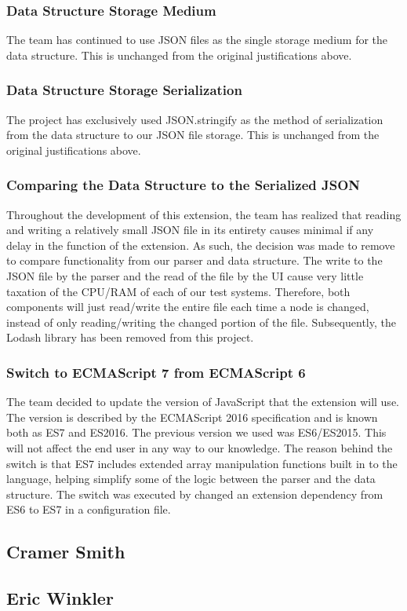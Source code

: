 \documentclass[letterpaper,10pt,titlepage,draftclsnofoot,onecolumn,onesided] {IEEEtran}
\begin{document}
\subsubsection{Data Structure Storage Medium}
The team has continued to use JSON files as the single storage medium for the data structure. 
This is unchanged from the original justifications above.

\subsubsection{Data Structure Storage Serialization}
The project has exclusively used JSON.stringify as the method of serialization from the data structure to our JSON file storage. 
This is unchanged from the original justifications above.

\subsubsection{Comparing the Data Structure to the Serialized JSON}
Throughout the development of this extension, the team has realized that reading and writing a relatively small JSON file in its entirety causes minimal if any delay in the function of the extension.
As such, the decision was made to remove to compare functionality from our parser and data structure. 
The write to the JSON file by the parser and the read of the file by the UI cause very little taxation of the CPU/RAM of each of our test systems.
Therefore, both components will just read/write the entire file each time a node is changed, instead of only reading/writing the changed portion of the file.
Subsequently, the Lodash library has been removed from this project.

\subsubsection{Switch to ECMAScript 7 from ECMAScript 6}
The team decided to update the version of JavaScript that the extension will use.
The version is described by the ECMAScript 2016 specification and is known both as ES7 and ES2016.
The previous version we used was ES6/ES2015.
This will not affect the end user in any way to our knowledge.
The reason behind the switch is that ES7 includes extended array manipulation functions built in to the language, helping simplify some of the logic between the parser and the data structure.
The switch was executed by changed an extension dependency from ES6 to ES7 in a configuration file. \cite{ES7}

\subsection{Cramer Smith}


\subsection{Eric Winkler}



\pagebreak


\end{document}
